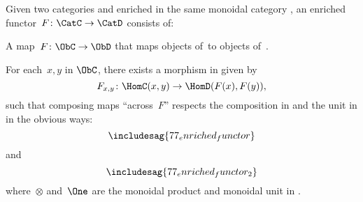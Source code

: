 \begin{ctdefinition}
    \label{defn:enrichedfunctor}
    Given two categories \CatC and \CatD enriched in the same monoidal category \CatV, an enriched functor~$F\colon \CatC \to \CatD$ consists of:
    \begin{compactenum}
        \item A map~$F\colon \ObC \to \ObD$ that maps objects of~\CatC to objects of~\CatD.
        \item For each~$x, y$ in $\ObC$, there exists a morphism in \CatV given by
        \begin{equation*}
            F_{x,y} \colon \HomC(x,y) \to \HomD(F(x), F(y)),
        \end{equation*}
        such that composing maps ``across~$F$'' respects the composition in \CatC and the unit in \CatV in the obvious ways:
        \begin{equation}
            \includesag{77_enriched_functor}
        \end{equation}
        and
        \begin{equation*}
            \includesag{77_enriched_functor_2}
        \end{equation*}
        where~$\otimes$ and~$\One$ are the monoidal product and monoidal unit in \CatV.
    \end{compactenum}
\end{ctdefinition}

